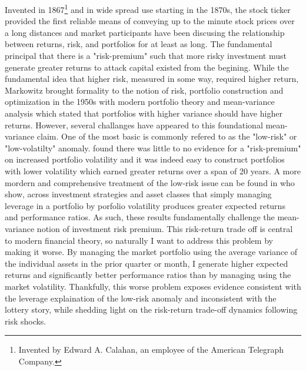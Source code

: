 \noindent Invented in 1867\footnote{Invented by Edward A. Calahan, an employee of the American Telegraph Company.} and in wide spread use starting in the 1870s, the stock ticker provided the first reliable means of conveying up to the minute stock prices over a long distances and market participants have been discusing the relationship between returns, risk, and portfolios for at least as long.\citep{rutterford_financial_2016} The fundamental principal that there is a "risk-premium" such that more risky investment must generate greater returns to attack capital existed from the begining. While the fundamental idea that higher risk, measured in some way, required higher return, Markowitz brought formality to the notion of risk, portfolio construction and optimization in the 1950s with modern portfolio theory and mean-variance analysis which stated that portfolios with higher variance should have higher returns.\citep{markowitz_portfolio_1952} However, several challanges have appeared to this foundational mean-variance claim. One of the most basic is commonly refered to as the "low-risk" or "low-volatilty" anomaly. \citet{haugen_1972} found there was little to no evidence for a "risk-premium" on increased portfolio volatility and it was indeed easy to construct portfolios with lower volatility which earned greater returns over a span of 20 years. A more mordern and comprehensive treatment of the low-risk issue can be found in \citet{moreira_volatility-managed_2017} who show, across investment strategies and asset classes that simply managing leverage in a portfolio by porfolio volatility produces greater expected returns and performance ratios. As such, these results fundamentally challenge the mean-variance notion of investment risk premium. This risk-return trade off is central to modern financial theory, so naturally I want to address this problem by making it worse. By managing the market portfolio using the average variance of the individual assets in the prior quarter or month, I generate higher expected returns and significantly better performance ratios than by managing using the market volatility. Thankfully, this worse problem exposes evidence consistent with the leverage explaination of the low-risk anomaly and inconsistent with the lottery story, while shedding light on the risk-return trade-off dynamics following risk shocks.


